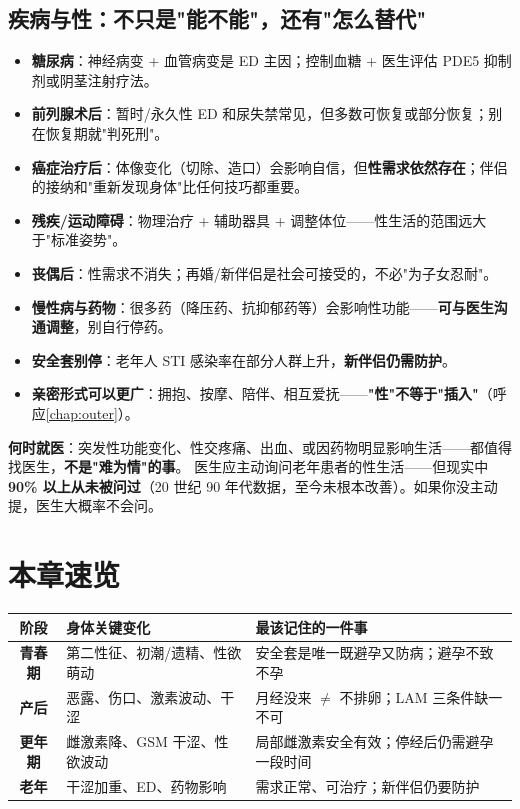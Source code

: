 \documentclass[12pt,UTF8,openany]{ctexbook}
\begin{document}
\subsection*{疾病与性：不只是"能不能"，还有"怎么替代"}

\begin{itemize}[leftmargin=2em,itemsep=0.3em]
  \item \textbf{糖尿病}：神经病变 + 血管病变是 ED 主因；控制血糖 + 医生评估 PDE5 抑制剂或阴茎注射疗法。
  \item \textbf{前列腺术后}：暂时/永久性 ED 和尿失禁常见，但多数可恢复或部分恢复；别在恢复期就"判死刑"。
  \item \textbf{癌症治疗后}：体像变化（切除、造口）会影响自信，但\textbf{性需求依然存在}；伴侣的接纳和"重新发现身体"比任何技巧都重要。
  \item \textbf{残疾/运动障碍}：物理治疗 + 辅助器具 + 调整体位——性生活的范围远大于"标准姿势"。
  \item \textbf{丧偶后}：性需求不消失；再婚/新伴侣是社会可接受的，不必"为子女忍耐"。
  \item \textbf{慢性病与药物}：很多药（降压药、抗抑郁药等）会影响性功能——\textbf{可与医生沟通调整}，别自行停药。
  \item \textbf{安全套别停}：老年人 STI 感染率在部分人群上升，\textbf{新伴侣仍需防护}。
  \item \textbf{亲密形式可以更广}：拥抱、按摩、陪伴、相互爱抚——\textbf{"性"不等于"插入"}（呼应\ref{chap:outer}）。
\end{itemize}

\textbf{何时就医}：突发性功能变化、性交疼痛、出血、或因药物明显影响生活——都值得找医生，\textbf{不是"难为情"的事}。
医生应主动询问老年患者的性生活——但现实中 \textbf{90\% 以上从未被问过}（20 世纪 90 年代数据，至今未根本改善）。如果你没主动提，医生大概率不会问。

\section{本章速览}

\begin{tabularx}{\linewidth}{C X X}
\toprule
\textbf{阶段} & \textbf{身体关键变化} & \textbf{最该记住的一件事} \\
\midrule
\textbf{青春期} & 第二性征、初潮/遗精、性欲萌动 & 安全套是唯一既避孕又防病；避孕不致不孕 \\
\textbf{产后} & 恶露、伤口、激素波动、干涩 & 月经没来 $\ne$ 不排卵；LAM 三条件缺一不可 \\
\textbf{更年期} & 雌激素降、GSM 干涩、性欲波动 & 局部雌激素安全有效；停经后仍需避孕一段时间 \\
\textbf{老年} & 干涩加重、ED、药物影响 & 需求正常、可治疗；新伴侣仍要防护 \\
\bottomrule
\end{tabularx}
\end{document}
